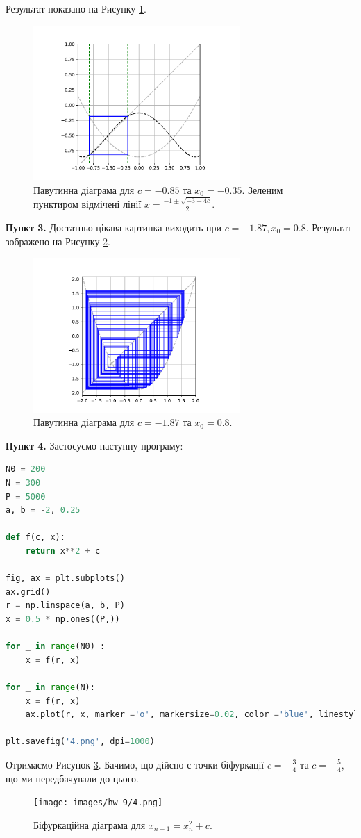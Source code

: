 \documentclass[oneside,solution]{tmpl}
\begin{document}
Результат показано на Рисунку \ref{fig:2}.
\begin{figure}
    \centering
    \includegraphics[width=0.7\textwidth]{images/hw_9/2.pdf}
    \caption{Павутинна діаграма для $c=-0.85$ та $x_0=-0.35$. Зеленим пунктиром відмічені лінії $x=\frac{-1\pm\sqrt{-3-4c}}{2}$.}
    \label{fig:2}
\end{figure}

\textbf{Пункт 3.} Достатньо цікава картинка виходить при $c=-1.87, x_0=0.8$. Результат зображено на Рисунку \ref{fig:3}.
\begin{figure}
    \centering
    \includegraphics[width=0.7\textwidth]{images/hw_9/3.pdf}
    \caption{Павутинна діаграма для $c=-1.87$ та $x_0=0.8$.}
    \label{fig:3}
\end{figure}

\textbf{Пункт 4.} Застосуємо наступну програму:
\begin{lstlisting}[language=Python]
N0 = 200
N = 300
P = 5000
a, b = -2, 0.25

def f(c, x):
    return x**2 + c

fig, ax = plt.subplots()
ax.grid()
r = np.linspace(a, b, P)
x = 0.5 * np.ones((P,))

for _ in range(N0) :
    x = f(r, x)
    
for _ in range(N):
    x = f(r, x)
    ax.plot(r, x, marker ='o', markersize=0.02, color ='blue', linestyle='None')
    
plt.savefig('4.png', dpi=1000)
\end{lstlisting}

Отримаємо Рисунок \ref{fig:4}. Бачимо, що дійсно є точки біфуркації $c=-\frac{3}{4}$ та $c=-\frac{5}{4}$, що ми передбачували до цього.

\begin{figure}
    \centering
    \texttt{[image: images/hw\_9/4.png]}
    \caption{Біфуркаційна діаграма для $x_{n+1}=x_n^2+c$.}
    \label{fig:4}
\end{figure}
\end{document}
